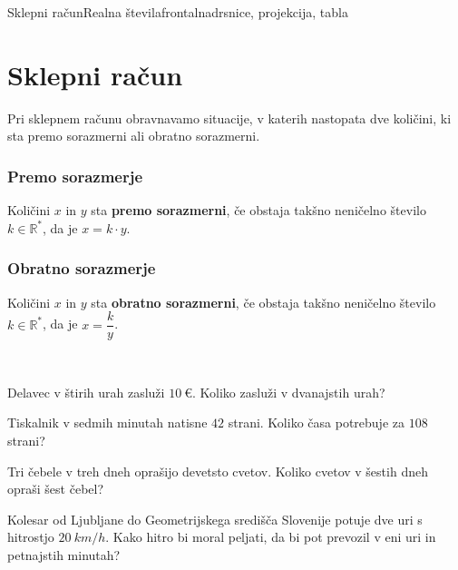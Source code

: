 \begin{priprava}{18}{}{Sklepni račun}{Realna števila}{frontalna}{drsnice, projekcija, tabla}
    
    \section{Sklepni račun}

    

        
            Pri sklepnem računu obravnavamo situacije, v katerih nastopata dve količini,
            ki sta premo sorazmerni ali obratno sorazmerni.
        

        \subsubsection*{Premo sorazmerje}
        Količini $x$ in $y$ sta \textbf{premo sorazmerni}, če obstaja takšno neničelno število $k\in\mathbb{R}^*$, da je $x=k\cdot y$.
        

        \subsubsection*{Obratno sorazmerje}
        Količini $x$ in $y$ sta \textbf{obratno sorazmerni}, če obstaja takšno neničelno število $k\in\mathbb{R}^*$, da je $x=\dfrac{k}{y}$.
        

    
~~~~\\


    
        \begin{naloga}
            Delavec v štirih urah zasluži $10~€$. Koliko zasluži v dvanajstih urah?            
        \end{naloga}

        \begin{naloga}
            Tiskalnik v sedmih minutah natisne $42$ strani. Koliko časa potrebuje za $108$ strani?            
        \end{naloga}

        \begin{naloga}
            Tri čebele v treh dneh oprašijo devetsto cvetov. Koliko cvetov v šestih dneh opraši šest čebel?            
        \end{naloga}
 
        \begin{naloga}
            Kolesar od Ljubljane do Geometrijskega središča Slovenije potuje dve uri s hitrostjo $20~km/h$. 
            Kako hitro bi moral peljati, da bi pot prevozil v eni uri in petnajstih minutah?            
        \end{naloga}
        

\end{priprava}
